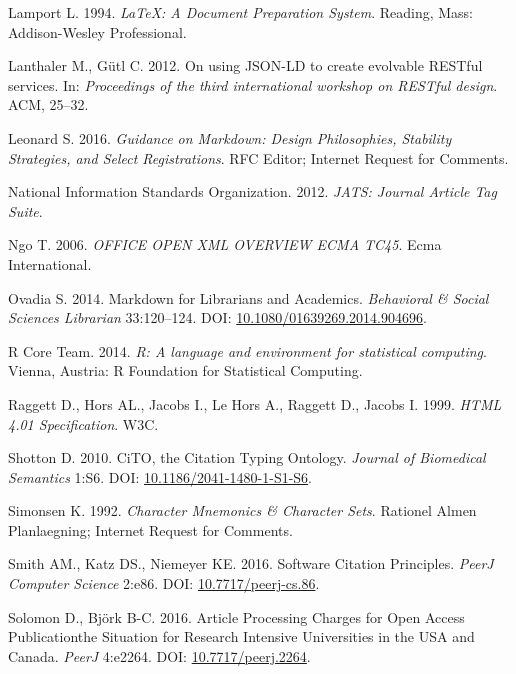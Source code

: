 \documentclass[10pt,fleqn]{wlpeerj}
\begin{document}
\hypertarget{ref-lamportux5flatex:ux5f1994}{}
Lamport L. 1994. \emph{LaTeX: A Document Preparation System}. Reading,
Mass: Addison-Wesley Professional.

\hypertarget{ref-lanthalerux5fjsonldux5f2012}{}
Lanthaler M., Gütl C. 2012. On using JSON-LD to create evolvable RESTful
services. In: \emph{Proceedings of the third international workshop on
RESTful design}. ACM, 25--32.

\hypertarget{ref-rfc7764}{}
Leonard S. 2016. \emph{Guidance on Markdown: Design Philosophies,
Stability Strategies, and Select Registrations}. RFC Editor; Internet
Request for Comments.

\hypertarget{ref-JATS}{}
National Information Standards Organization. 2012. \emph{JATS: Journal
Article Tag Suite}.

\hypertarget{ref-OOXML}{}
Ngo T. 2006. \emph{OFFICE OPEN XML OVERVIEW ECMA TC45}. Ecma
International.

\hypertarget{ref-ovadiaux5fmarkdownux5f2014}{}
Ovadia S. 2014. Markdown for Librarians and Academics. \emph{Behavioral
\& Social Sciences Librarian} 33:120--124. DOI:
\href{https://doi.org/10.1080/01639269.2014.904696}{10.1080/01639269.2014.904696}.

\hypertarget{ref-Rux5f2014}{}
R Core Team. 2014. \emph{R: A language and environment for statistical
computing}. Vienna, Austria: R Foundation for Statistical Computing.

\hypertarget{ref-HTML4}{}
Raggett D., Hors AL., Jacobs I., Le Hors A., Raggett D., Jacobs I. 1999.
\emph{HTML 4.01 Specification}. W3C.

\hypertarget{ref-shottonux5fcitoux5f2010}{}
Shotton D. 2010. CiTO, the Citation Typing Ontology. \emph{Journal of
Biomedical Semantics} 1:S6. DOI:
\href{https://doi.org/10.1186/2041-1480-1-S1-S6}{10.1186/2041-1480-1-S1-S6}.

\hypertarget{ref-rfc1345}{}
Simonsen K. 1992. \emph{Character Mnemonics \& Character Sets}. Rationel
Almen Planlaegning; Internet Request for Comments.

\hypertarget{ref-smithux5fsoftwareux5f2016}{}
Smith AM., Katz DS., Niemeyer KE. 2016. Software Citation Principles.
\emph{PeerJ Computer Science} 2:e86. DOI:
\href{https://doi.org/10.7717/peerj-cs.86}{10.7717/peerj-cs.86}.

\hypertarget{ref-solomonux5farticleux5f2016}{}
Solomon D., Björk B-C. 2016. Article Processing Charges for Open Access
Publicationthe Situation for Research Intensive Universities in the USA
and Canada. \emph{PeerJ} 4:e2264. DOI:
\href{https://doi.org/10.7717/peerj.2264}{10.7717/peerj.2264}.
\end{document}
